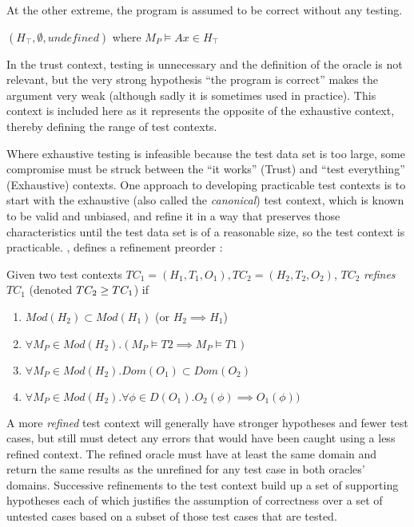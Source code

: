 {At the other extreme, the program is assumed to be correct without any testing.

\begin{df} 
$(H_\top, \emptyset, undefined)$ where $M_P \models Ax \in H_\top$
\end{df}

\noindent In the trust context, 
testing is unnecessary and the definition of the oracle is not relevant,
but the very strong hypothesis ``the program is correct'' makes 
the argument very weak
(although sadly it is sometimes used in practice).
This context is included here as it represents the opposite of the exhaustive context,
thereby defining the range of test contexts.

Where exhaustive testing is infeasible because the test data set is too large, 
some compromise must be struck between 
the ``it works'' (Trust)  and ``test everything'' (Exhaustive) contexts.
One approach to developing practicable test contexts
is to start with the exhaustive (also called the \emph{canonical}) test context, 
which is known to be valid and unbiased,
and refine it in a way that preserves those characteristics
until the test data set is of a reasonable size,
so the test context is practicable.
\cite{BernotGaudelMarre1991}, defines a refinement preorder :

\begin{df}
Given two test contexts $TC_1 = (H_1, T_1, O_1), TC_2 = (H_2, T_2, O_2)$,
$TC_2$ \emph{refines} $TC_1$ (denoted $TC_2 \geq TC_1$) if

\begin{enumerate}
\item $ Mod(H_2) \subset Mod(H_1)$ (or $H_2 \implies H_1$)
\item $ \forall M_P \in Mod(H_2) . (M_P \models T2 \implies M_P \models T1)$
\item $ \forall M_P \in Mod(H_2) . Dom(O_1) \subset Dom(O_2)$
\item $ \forall M_P \in Mod(H_2) . \forall \phi \in D(O_1). O_2(\phi)  \implies O_1(\phi))$
\end{enumerate}

\end{df}

\noindent
A more \emph{refined} test context will generally have 
stronger hypotheses and fewer test cases,
but still must detect any errors that would have been caught using a less refined context.
The refined oracle must have at least the same domain and 
return the same results as the unrefined for any test case in both oracles' domains.
Successive refinements to the test context build up a set of supporting hypotheses
each of which justifies the assumption of correctness over a set of untested cases
based on a subset of those test cases that are tested.

}
